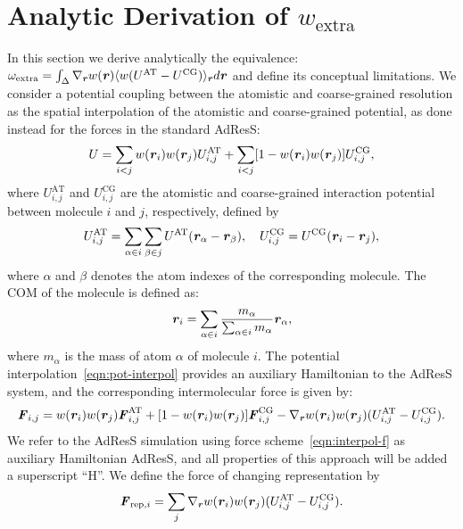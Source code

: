 \documentclass[a4paper,preprint,unsortedaddress]{revtex4-1}
\newcommand{\recheck}[1]{{\color{red} #1}}
\newcommand{\vect}[1]{\textbf{\textit{#1}}}
\newcommand{\AT}{{\textrm{{AT}}}}
\newcommand{\CG}{{\textrm{CG}}}
\newcommand{\res}{{\textrm{rep}}}
\newcommand{\ext}{{\textrm{extra}}}
\begin{document}
\section{Analytic Derivation of  $w_{\ext}$}\label{sec:tmp4}
\recheck{In this section we derive analytically the equivalence:
  $\omega_{\ext}=\int_{\Delta}\nabla_{\vect r} w(\vect r) \langle w(U^{\AT}-U^{\CG})\rangle_{\vect r} d{\vect r}$ and define its conceptual limitations.
We consider a potential coupling between the atomistic and coarse-grained resolution as the spatial interpolation of the atomistic and coarse-grained potential, as done instead for the forces in the standard AdResS:
\begin{align}
  U =
  \sum_{i<j} w(\vect r_i) w(\vect r_j)
  U^\AT_{i,j}
  +
  \sum_{i<j}[1- w(\vect r_i) w(\vect r_j)]
  U^\CG_{i,j},
\end{align}
where $U^\AT_{i,j}$ and $U^\CG_{i,j}$ are the atomistic and coarse-grained interaction potential between molecule $i$ and $j$, respectively, defined by
\begin{align}\label{eqn:pot-interpol}
  U^\AT_{i,j} =
  \sum_{\alpha\in i}\sum_{\beta\in j} U^\AT(\vect r_\alpha - \vect r_\beta),\quad
  U^\CG_{i,j} =
  U^\CG(\vect r_i - \vect r_j),
\end{align}
where  $\alpha$ and $\beta$ denotes the atom indexes of the corresponding molecule.
The COM of the molecule is defined as:
\begin{align}
  \vect r_i = \sum_{\alpha\in i} \frac{m_\alpha}{\sum_{\alpha\in i} m_\alpha} \vect r_\alpha,
\end{align}
where $m_\alpha$ is the mass of atom $\alpha$ of molecule $i$.
\recheck{The potential interpolation~\eqref{eqn:pot-interpol} provides an auxiliary Hamiltonian to the AdResS system, and
the
corresponding intermolecular force is given by:}
\begin{align}\label{eqn:interpol-f}
  \vect F_{i,j} =
  w(\vect r_i) w(\vect r_j)
  \vect F^\AT_{i,j}
  +
  [1- w(\vect r_i) w(\vect r_j)]
  \vect F_{i,j}^\CG
  -
  \nabla_{\vect r} w(\vect r_i) w(\vect r_j)
  (U^\AT_{i,j} - U^\CG_{i,j}).
\end{align}
\recheck{We refer to the AdResS simulation using force scheme~\eqref{eqn:interpol-f} as
  auxiliary Hamiltonian AdResS, and all properties of this approach will be added a superscript ``H''}.
We define the force of changing representation by
\begin{align}\label{eqn:frep}
  \vect F_{\res,i} = 
  \sum_j \nabla_{\vect r} w(\vect r_i) w(\vect r_j)
  (U^\AT_{i,j} - U^\CG_{i,j}).
\end{align}


}
\end{document}
